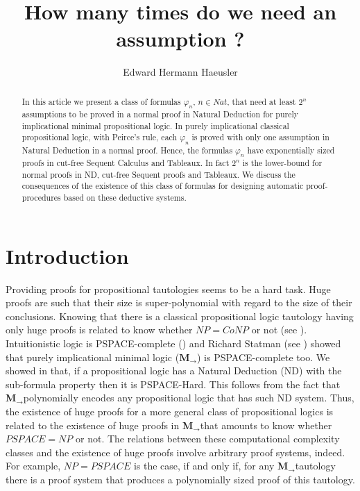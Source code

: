 \documentclass[11pt]{llncs}
\title{How many times do we need an assumption ?}
\author{Edward Hermann Haeusler}
\institute{Dep. Inform\'atica \\ PUC-Rio \\ \texttt{hermann@inf.puc-rio.br}}
\date{}
\newcommand{\mil}{\ensuremath{\mathbf{M}_{\rightarrow}}}
\begin{document}
\maketitle

\begin{abstract}
In this article we present a class of formulas $\varphi_n$, $n\in Nat$, that need at least $2^{n}$ assumptions to be proved in a normal proof in Natural Deduction for purely implicational minimal propositional logic. In purely implicational classical propositional logic, with Peirce's rule, each $\varphi_n$ is proved with only one assumption in Natural Deduction in a normal proof. Hence, the formulas $\varphi_n$ have exponentially sized proofs in cut-free Sequent Calculus and  Tableaux. In fact $2^n$ is the lower-bound for normal proofs in ND, cut-free Sequent proofs and Tableaux. We discuss the consequences of the existence of this class of formulas for designing automatic proof-procedures based on these deductive systems.  
\end{abstract} 



\section{Introduction}\label{intro}

Providing proofs for propositional tautologies seems to be a hard task.  Huge proofs are such that their size is  super-polynomial with regard to  the size of their conclusions.  Knowing that there is a classical propositional logic tautology having only huge proofs is related to know whether $NP=CoNP$ or not (see \cite{Cook}). Intuitionistic logic is PSPACE-complete (\cite{Ladner}) and Richard Statman (see \cite{Statman}) showed that purely implicational minimal logic (\mil) is PSPACE-complete too. 
We showed in \cite{Haeusler} that, if a propositional logic has a Natural Deduction (ND) with the sub-formula property then it is PSPACE-Hard. This follows from the fact that \mil polynomially encodes any propositional logic that has such ND system.  Thus, 
the existence of huge proofs for a more general class of propositional logics is related to the existence of huge proofs in \mil that amounts to know whether $PSPACE=NP$ or not. The relations between these computational complexity classes and the existence of huge proofs involve arbitrary proof systems, indeed. For example, $NP=PSPACE$ is the case, if and only if, for any \mil tautology there is a proof system that produces a polynomially sized proof of this tautology. 
\end{document}
